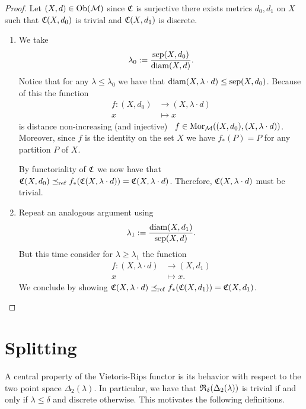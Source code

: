 \begin{proof}
    Let $(X,d) \in \mathrm {Ob}(\mathcal{M})$ since $\mathfrak{C}$ is surjective there exists metrics $d_0, d_1$ on $X$ such that $\mathfrak{C}(X,d_0)$ is trivial and $\mathfrak{C}(X,d_1)$ is discrete.

    \begin{enumerate}
        \item We take
        $$
        \lambda_0 := \frac{\mathrm{sep}(X,d_0)}{\mathrm{diam}(X,d)}.
        $$ 
        Notice that for any $\lambda \le \lambda_0$ we have that $\mathrm{diam}(X,\lambda \cdot d) \le \mathrm{sep}(X,d_0)$.
        Because of this the function
        \begin{align*}
            f: (X, d_0) &\longrightarrow (X, \lambda \cdot d)\\
            x &\longmapsto x
        \end{align*}
        is distance non-increasing (and injective) \ie\ $f \in \mathrm {Mor}_{\mathcal{M}}((X,d_0), (X,\lambda \cdot d))$. Moreover, since $f$ is the identity on the set $X$ we have $f_*(P) = P$ for any partition $P$ of $X$.

        By functoriality of $\mathfrak{C}$ we now have that $\mathfrak{C}(X,d_0) \preceq_\mathrm{ref} f_*(\mathfrak{C}(X,\lambda \cdot d)) = \mathfrak{C}(X,\lambda \cdot d)$. Therefore, $\mathfrak{C}(X,\lambda \cdot d)$ must be trivial.

        \item Repeat an analogous argument using
        $$
        \lambda_1 := \frac{\mathrm{diam}(X,d_1)}{\mathrm{sep}(X,d)}.
        $$
        But this time consider for $\lambda \ge \lambda_1$ the function
        \begin{align*}
            f: (X, \lambda \cdot d) &\longrightarrow (X, d_1)\\
            x &\longmapsto x.
        \end{align*}
        We conclude by showing $\mathfrak{C}(X,\lambda \cdot d) \preceq_\mathrm{ref} f_*(\mathfrak{C}(X,d_1)) = \mathfrak{C}(X,d_1)$. 
        
    \end{enumerate}
\end{proof}

\section{Splitting}

A central property of the Vietoris-Rips functor is its behavior with respect to the two point space $\Delta_2(\lambda)$. In particular, we have that $\mathfrak{R}_\delta(\Delta_2(\lambda))$ is trivial if and only if $\lambda \le \delta$ and discrete otherwise.
This motivates the following definitions.

